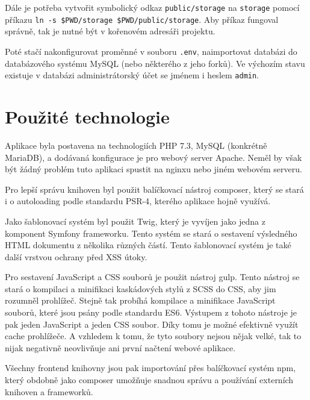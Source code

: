 \documentclass[12pt, a4paper]{article}
\begin{document}
    Dále je potřeba vytvořit symbolický odkaz {\tt public/storage} na {\tt storage} pomocí příkazu {\tt ln -s \$PWD/storage \$PWD/public/storage}. Aby příkaz fungoval správně, tak je nutné být v kořenovém adresáři projektu.

    Poté stačí nakonfigurovat proměnné v souboru {\tt .env}, naimportovat databázi do databázového systému MySQL (nebo některého z jeho forků). Ve výchozím stavu existuje v databázi administrátorský účet se jménem i heslem {\tt admin}.

    \section{Použité technologie}
    Aplikace byla postavena na technologiích PHP 7.3, MySQL (konkrétně MariaDB), a dodávaná konfigurace je pro webový server Apache. Neměl by však být žádný problém tuto aplikaci spustit na nginxu nebo jiném webovém serveru.

    Pro lepší správu knihoven byl použit balíčkovací nástroj composer, který se stará i o autoloading podle standardu PSR-4, kterého aplikace hojně využívá.

    Jako šablonovací systém byl použit Twig, který je vyvíjen jako jedna z komponent Symfony frameworku. Tento systém se stará o sestavení výsledného HTML dokumentu z několika různých částí. Tento šablonovací systém je také další vrstvou ochrany před XSS útoky.

    Pro sestavení JavaScript a CSS souborů je použit nástroj gulp. Tento nástroj se stará o kompilaci a minifikaci kaskádových stylů z SCSS do CSS, aby jim rozumněl prohlížeč. Stejně tak probíhá kompilace a minifikace JavaScript souborů, které jsou psány podle standardu ES6. Výstupem z tohoto nástroje je pak jeden JavaScript a jeden CSS soubor. Díky tomu je možné efektivně využít cache prohlížeče. A vzhledem k tomu, že tyto soubory nejsou nějak velké, tak to nijak negativně neovlivňuje ani první načtení webové aplikace.

    Všechny frontend knihovny jsou pak importování přes balíčkovací systém npm, který obdobně jako composer umožňuje snadnou správu a používání externích knihoven a frameworků.
\end{document}
